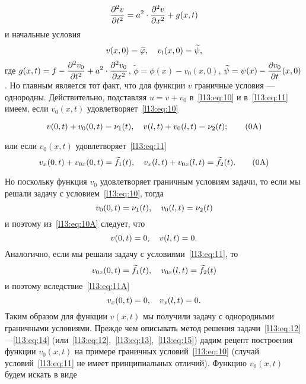 \begin{equation}\label{l13:eq:12}
	\hfill\pdder{v}{t}=a^2\cdot\pdder{v}{x}+g(x,t)\hfill
\end{equation}
и начальные условия
\begin{equation}\label{l13:eq:13}
	\hfill v(x,0)=\widetilde{\phi},\quad v_t(x,0)=\widetilde{\psi},\hfill
\end{equation}
где $\displaystyle g(x,t)=f-\frac{\partial^2v_0}{\partial t^2}+a^2\cdot\frac{\partial^2v_0}{\partial x^2}$, $\widetilde{\phi}=\phi(x)-v_0(x,0)$, $\displaystyle\widetilde{\psi}=\psi(x)-\frac{\partial v_0}{\partial t}(x,0)$. Но главным является тот факт, что для функции $v$ граничные условия --- однородны. Действительно, подставляя $u=v+v_0$ в~\eqref{l13:eq:10} и в~\eqref{l13:eq:11} имеем, если $v_0(x,t)$ удовлетворяет~\eqref{l13:eq:10}\addtocounter{equation}{-3}
\begin{equation}\label{l13:eq:10A}
	\hfill v(0,t)+v_0(0,t)=\nu_1(t),\quad v(l,t)+v_0(l,t)=\nu_2(t);\hfill\tag{\theequation A}
\end{equation}\addtocounter{equation}{1}
или если $v_0(x,t)$ удовлетворяет~\eqref{l13:eq:11}
\begin{equation}\label{l13:eq:11A}
	\hfill v_x(0,t)+v_{0x}(0,t)=\widetilde{f}_1(t),\quad v_x(l,t)+v_{0x}(l,t)=\widetilde{f}_2(t).\hfill\tag{\theequation A}
\end{equation}\addtocounter{equation}{2}
Но поскольку функция $v_0$ удовлетворяет граничным условиям задачи, то если мы решали задачу с условием~\eqref{l13:eq:10}, тогда
\begin{equation*}
	\hfill v_0(0,t)=\nu_1(t),\quad v_0(l,t)=\nu_2(t)\hfill
\end{equation*} 
и поэтому из~\eqref{l13:eq:10A} следует, что
\begin{equation}\label{l13:eq:14}
	\hfill v(0,t)=0,\quad v(l,t)=0.\hfill
\end{equation}
Аналогично, если мы решали задачу с условиями~\eqref{l13:eq:11}, то 
\begin{equation*}
	\hfill v_{0x}(0,t)=\widetilde{f}_1(t),\quad v_{0x}(l,t)=\widetilde{f}_2(t)\hfill
\end{equation*} 
и поэтому вследствие~\eqref{l13:eq:11A} 
\begin{equation}\label{l13:eq:15}
	\hfill v_x(0,t)=0,\quad v_x(l,t)=0.\hfill
\end{equation}
Таким образом для функции $v(x,t)$ мы получили задачу с однородными граничными условиями. Прежде чем описывать метод решения задачи~\eqref{l13:eq:12}---\eqref{l13:eq:14} (или~\eqref{l13:eq:12},~\eqref{l13:eq:13},~\eqref{l13:eq:15}) дадим рецепт построения функции $v_0(x,t)$ на примере граничных условий~\eqref{l13:eq:10} (случай условий~\eqref{l13:eq:11} не имеет принципиальных отличий). Функцию $v_0(x,t)$ будем искать в виде
